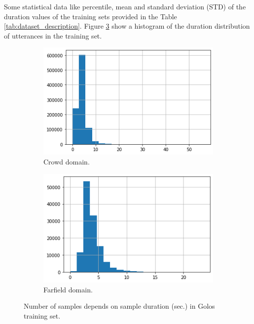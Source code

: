 \documentclass[a4paper]{article}
\begin{document}
Some statistical data like percentile, mean and standard deviation (STD) of the duration values of the training sets provided in the Table \ref{tab:dataset_description}. Figure \ref{fig:duration_distribution} show a histogram of the duration distribution of utterances in the training set.

\begin{figure}[ht]
\begin{subfigure}{.49\linewidth}
  \centering
  \includegraphics[width=1.\linewidth]{LaTeX/img/toloka_lens.png}  
  \caption{Crowd domain.}
  \label{fig:sub-first}
\end{subfigure}
\begin{subfigure}{.49\linewidth}
  \centering
  \includegraphics[width=1.\linewidth]{LaTeX/img/portal_lens.png}  
  \caption{Farfield domain.}
  \label{fig:sub-second}
\end{subfigure}
\caption{Number of samples depends on sample duration (sec.) in Golos training set.}
\label{fig:duration_distribution}
\end{figure}
\end{document}
